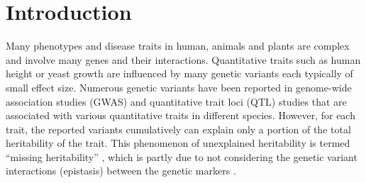 \documentclass[authoryear,preprint,review,12pt]{elsarticle}
\begin{document}



\linenumbers
\section{Introduction}
Many phenotypes and disease traits in human, animals and plants are complex and involve many genes and their
interactions.  Quantitative traits such as human height or yeast growth are influenced by many genetic variants each
typically of small effect size.  Numerous genetic variants have been reported in genome-wide association studies (GWAS)
and quantitative trait loci (QTL) studies that are associated with various quantitative traits in different
species. However, for each trait, the reported variants cumulatively can explain only a portion of the total
heritability of the trait.  This phenomenon of unexplained heritability is termed ``missing heritability''
\cite[]{Maher2008}, which is partly due to not considering the genetic variant interactions (epistasis) between the
genetic markers \cite[]{Zuk.et.al.2012}.
\end{document}
